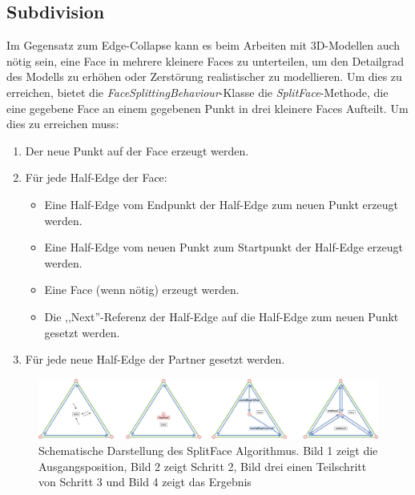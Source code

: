 \subsection{Subdivision}
Im Gegensatz zum Edge-Collapse kann es beim Arbeiten mit 3D-Modellen auch n\"otig sein, eine Face in mehrere kleinere Faces zu unterteilen, um den Detailgrad des Modells zu erh\"ohen oder Zerst\"orung realistischer zu modellieren. Um dies zu erreichen, bietet die \textit{FaceSplittingBehaviour}-Klasse die \textit{SplitFace}-Methode, die eine gegebene Face an einem gegebenen Punkt in drei kleinere Faces Aufteilt. Um dies zu erreichen muss:
\begin{enumerate}
	\item Der neue Punkt auf der Face erzeugt werden.
	\item F\"ur jede Half-Edge der Face:
	\begin{itemize}
		\item Eine Half-Edge vom Endpunkt der Half-Edge zum neuen Punkt erzeugt werden.
		\item Eine Half-Edge vom neuen Punkt zum Startpunkt der Half-Edge erzeugt werden.
		\item Eine Face (wenn n\"otig) erzeugt werden.
		\item Die ,,Next''-Referenz der Half-Edge auf die Half-Edge zum neuen Punkt gesetzt werden.
	\end{itemize}
	\item F\"ur jede neue Half-Edge der Partner gesetzt werden.
\end{enumerate}
\begin{figure}[H]
	\centering
	\includegraphics[width=1\linewidth]{Images/splitFace}
	\caption{Schematische Darstellung des SplitFace Algorithmus. Bild 1 zeigt die Ausgangsposition, Bild 2 zeigt Schritt 2, Bild drei einen Teilschritt von Schritt 3 und Bild 4 zeigt das Ergebnis}
	\label{fig:splitface}
\end{figure}

